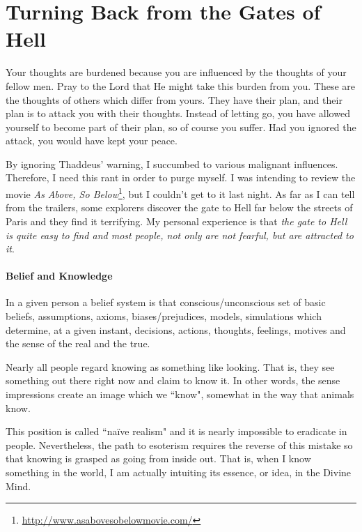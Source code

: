 \section{Turning Back from the Gates of Hell}

\begin{quotex}
Your thoughts are burdened because you are influenced by the thoughts of your fellow men. Pray to the Lord that He might take this burden from you. These are the thoughts of others which differ from yours. They have their plan, and their plan is to attack you with their thoughts. Instead of letting go, you have allowed yourself to become part of their plan, so of course you suffer. Had you ignored the attack, you would have kept your peace. 

\end{quotex}

By ignoring Thaddeus' warning, I succumbed to various malignant influences. Therefore, I need this rant in order to purge myself. I was intending to review the movie \textit{As Above, So Below}\footnote{\url{http://www.asabovesobelowmovie.com/}}, but I couldn't get to it last night. As far as I can tell from the trailers, some explorers discover the gate to Hell far below the streets of Paris and they find it terrifying. My personal experience is that \emph{the gate to Hell is quite easy to find and most people, not only are not fearful, but are attracted to it}.

\paragraph{Belief and Knowledge}
\begin{quotex}
In a given person a belief system is that conscious/unconscious set of basic beliefs, assumptions, axioms, biases/prejudices, models, simulations which determine, at a given instant, decisions, actions, thoughts, feelings, motives and the sense of the real and the true. 

\end{quotex}
Nearly all people regard knowing as something like looking. That is, they see something out there right now and claim to know it. In other words, the sense impressions create an image which we ``know", somewhat in the way that animals know.

This position is called ``naïve realism" and it is nearly impossible to eradicate in people. Nevertheless, the path to esoterism requires the reverse of this mistake so that knowing is grasped as going from inside out. That is, when I know something in the world, I am actually intuiting its essence, or idea, in the Divine Mind.

